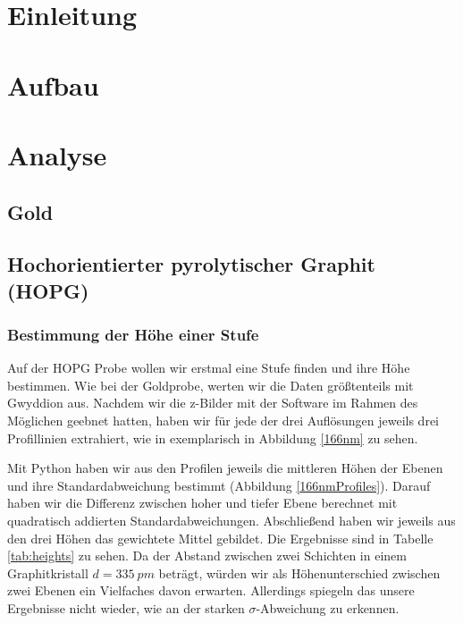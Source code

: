 \tableofcontents
\newpage
\listoffigures

\listoftables

\skippage

\setcounter{page}{1}
\restoregeometry
\thispagestyle{fancy}


\section{Einleitung}


\section{Aufbau}


\section{Analyse}
\subsection{Gold}

\subsection{Hochorientierter pyrolytischer Graphit (HOPG)}
\subsubsection{Bestimmung der Höhe einer Stufe}

Auf der HOPG Probe wollen wir erstmal eine Stufe finden und ihre Höhe bestimmen. Wie bei der Goldprobe, werten wir die Daten größtenteils mit Gwyddion aus. Nachdem wir die z-Bilder mit der Software im Rahmen des Möglichen geebnet hatten, haben wir für jede der drei Auflösungen jeweils drei Profillinien extrahiert, wie in exemplarisch in Abbildung \ref{166nm} zu sehen.

Mit Python haben wir aus den Profilen jeweils die mittleren Höhen der Ebenen und ihre Standardabweichung bestimmt (Abbildung \ref{166nmProfiles}). Darauf haben wir die Differenz zwischen hoher und tiefer Ebene berechnet mit quadratisch addierten Standardabweichungen. Abschließend haben wir jeweils aus den drei Höhen das gewichtete Mittel gebildet. Die Ergebnisse sind in Tabelle \ref{tab:heights} zu sehen. Da der Abstand zwischen zwei Schichten in einem Graphitkristall $d = \SI{335}{pm}$ beträgt, würden wir als Höhenunterschied zwischen zwei Ebenen ein Vielfaches davon erwarten. Allerdings spiegeln das unsere Ergebnisse nicht wieder, wie an der starken $\sigma$-Abweichung zu erkennen.

